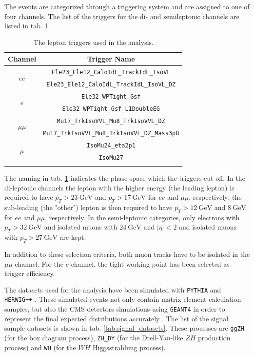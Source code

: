 The events are categorized through a triggering system and are assigned to one of four channels. The list of the triggers for the di- and semileptonic channels are listed in tab. \ref{tab:triggers}.

\begin{table}[h!]
	\centering
	\begin{tabular}{cc}
		Channel & Trigger Name \\
		\hline 
		\multirow{2}{*}{$ee$} & \texttt{Ele23\_Ele12\_CaloIdL\_TrackIdL\_IsoVL} \\
		& \texttt{Ele23\_Ele12\_CaloIdL\_TrackIdL\_IsoVL\_DZ} \\
		\hline 
		\multirow{2}{*}{$e$} & \texttt{Ele32\_WPTight\_Gsf} \\
		& \texttt{Ele32\_WPTight\_Gsf\_L1DoubleEG} \\
		\hline 
		\multirow{2}{*}{$\mu\mu$} & \texttt{Mu17\_TrkIsoVVL\_Mu8\_TrkIsoVVL\_DZ} \\
		& \texttt{Mu17\_TrkIsoVVL\_Mu8\_TrkIsoVVL\_DZ\_Mass3p8} \\
		\hline 
		\multirow{2}{*}{$\mu$} & \texttt{IsoMu24\_eta2p1} \\
		& \texttt{IsoMu27} \\
		\hline \\
	\end{tabular}
	\caption{The lepton triggers used in the analysis.}
	\label{tab:triggers}
\end{table}

The naming in tab. \ref{tab:triggers} indicates the phase space which the triggers cut off. In the di-leptonic channels the lepton with the higher energy (the leading lepton) is required to have $p_T > \SI{23}{\giga\electronvolt}$ and $p_T > \SI{17}{\giga\electronvolt}$ for $ee$ and $\mu\mu$, respectively; the sub-leading (the "other") lepton is then required to have $p_T>\SI{12}{\giga\electronvolt}$ and $\SI{8}{\giga\electronvolt}$ for $ee$ and $\mu\mu$, respectively. In the semi-leptonic categories, only electrons with $p_T>\SI{32}{\giga\electronvolt}$ and isolated muons with $\SI{24}{\giga\electronvolt}$ and $|\eta|<2$ and isolated muons with $p_T>\SI{27}{\giga\electronvolt}$ are kept.

In addition to these selection criteria, both muon tracks have to be isolated in the $\mu\mu$ channel. For the $e$ channel, the tight working point has been selected as trigger efficiency.

The datasets used for the analysis have been simulated with \texttt{PYTHIA} \cite{Sj_strand_2008} and \texttt{HERWIG++} \cite{herwig}. These simulated events not only contain matrix element calculation samples, but also the CMS detectors simulations using \texttt{GEANT4} in order to represent the final expected distributions accurately \cite{geant1, geant2, geant3}. The list of the signal sample datasets is shown in tab. \ref{tab:signal_datasets}. These processes are \texttt{ggZH} (for the box diagram process), \texttt{ZH\_DY} (for the Drell-Yan-like $ZH$ production process) and \texttt{WH} (for the $WH$ Higgsstrahlung process).

